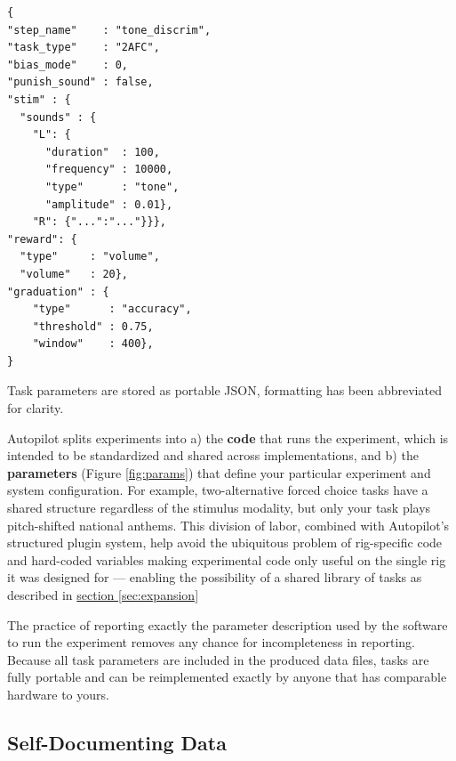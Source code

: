 %
\begin{marginfigure}[1.5cm]
\begin{verbatim}
{
"step_name"    : "tone_discrim",
"task_type"    : "2AFC",
"bias_mode"    : 0,
"punish_sound" : false,
"stim" : {
  "sounds" : {
    "L": {
      "duration"  : 100,
      "frequency" : 10000,
      "type"      : "tone",
      "amplitude" : 0.01},
    "R": {"...":"..."}}},
"reward": {
  "type"     : "volume",
  "volume"   : 20},
"graduation" : {
    "type"      : "accuracy",
    "threshold" : 0.75,
    "window"    : 400},
}
\end{verbatim}
\caption{Task parameters are stored as portable JSON, formatting has been abbreviated for clarity.}
\label{fig:params}
\end{marginfigure}%
%
%
Autopilot splits experiments into a) the \textbf{code} that runs the experiment, which is intended to be standardized and shared across implementations, and b) the \textbf{parameters} (Figure \ref{fig:params}) that define your particular experiment and system configuration. For example, two-alternative forced choice tasks have a shared structure regardless of the stimulus modality, but only your task plays pitch-shifted national anthems. This division of labor, combined with Autopilot's structured plugin system, help avoid the ubiquitous problem of rig-specific code and hard-coded variables making experimental code only useful on the single rig it was designed for --- enabling the possibility of a shared library of tasks as described in \hyperref[sec:expansion]{section \ref{sec:expansion}}%

The practice of reporting exactly the parameter description used by the software to run the experiment removes any chance for incompleteness in reporting. Because all task parameters are included in the produced data files, tasks are fully portable and can be reimplemented exactly by anyone that has comparable hardware to yours. 

\subsection{Self-Documenting Data}
\label{sec:data}

